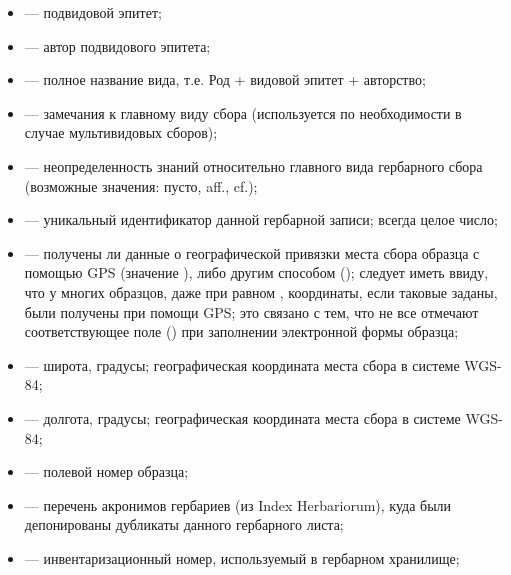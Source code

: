 \documentclass[letterpaper,10pt,russian]{sphinxmanual}
\begin{document}
\begin{itemize}
\item {} 
 — подвидовой эпитет;

\item {} 
 — автор подвидового эпитета;

\item {} 
 — полное название вида, т.е. Род + видовой эпитет + авторство;

\item {} 
 — замечания к главному виду сбора (используется по необходимости в случае мультивидовых сборов);

\item {} 
 — неопределенность знаний относительно главного вида гербарного сбора (возможные значения: пусто, aff., cf.);

\item {} 
 — уникальный идентификатор данной гербарной записи; всегда целое число;

\item {} 
 — получены ли данные о географической привязки места сбора образца с помощью GPS (значение ), либо другим способом (); следует иметь ввиду, что у многих образцов, даже при  равном , координаты, если таковые заданы, были получены при помощи GPS; это связано с тем, что не все отмечают соответствующее поле () при заполнении электронной формы образца;

\item {} 
 —  широта, градусы; географическая координата места сбора в системе WGS-84;

\item {} 
 — долгота, градусы; географическая координата места сбора в системе WGS-84;

\item {} 
 — полевой номер образца;

\item {} 
 — перечень акронимов гербариев (из Index Herbariorum), куда были депонированы дубликаты данного гербарного листа;

\item {} 
 — инвентаризационный номер, используемый в гербарном хранилище;


\end{itemize}
\end{document}
